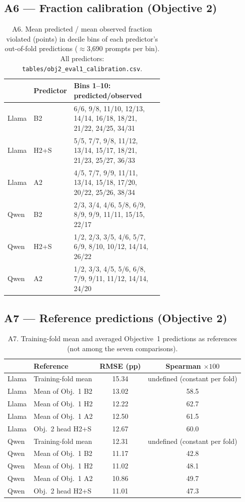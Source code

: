 \subsection*{A6 --- Fraction calibration (Objective 2)}
\begin{table}[h]
\centering\scriptsize
\caption{A6. Mean predicted / mean observed fraction violated (points) in decile bins of each predictor's out-of-fold predictions ($\approx$3,690 prompts per bin). All predictors: \texttt{tables/obj2\_eval1\_calibration.csv}.}
\label{tab:A6}
\begin{tabular}{llp{0.62\linewidth}}
\toprule
 & Predictor & Bins 1--10: predicted/observed \\
\midrule
Llama & B2 & 6/6, 9/8, 11/10, 12/13, 14/14, 16/18, 18/21, 21/22, 24/25, 34/31 \\
Llama & H2+S & 5/5, 7/7, 9/8, 11/12, 13/14, 15/17, 18/21, 21/23, 25/27, 36/33 \\
Llama & A2 & 4/5, 7/7, 9/9, 11/11, 13/14, 15/18, 17/20, 20/22, 25/26, 38/34 \\
Qwen & B2 & 2/3, 3/4, 4/6, 5/8, 6/9, 8/9, 9/9, 11/11, 15/15, 22/17 \\
Qwen & H2+S & 1/2, 2/3, 3/5, 4/6, 5/7, 6/9, 8/10, 10/12, 14/14, 26/22 \\
Qwen & A2 & 1/2, 3/3, 4/5, 5/6, 6/8, 7/9, 9/11, 11/12, 14/14, 24/20 \\
\bottomrule
\end{tabular}
\end{table}

\subsection*{A7 --- Reference predictions (Objective 2)}
\begin{table}[h]
\centering\scriptsize
\caption{A7. Training-fold mean and averaged Objective~1 predictions as references (not among the seven comparisons).}
\label{tab:A7}
\begin{tabular}{llcc}
\toprule
 & Reference & RMSE (pp) & Spearman $\times100$ \\
\midrule
Llama & Training-fold mean & 15.34 & undefined (constant per fold) \\
Llama & Mean of Obj.~1 B2 & 13.02 & 58.5 \\
Llama & Mean of Obj.~1 H2 & 12.22 & 62.7 \\
Llama & Mean of Obj.~1 A2 & 12.50 & 61.5 \\
Llama & Obj.~2 head H2+S & 12.67 & 60.0 \\
\midrule
Qwen & Training-fold mean & 12.31 & undefined (constant per fold) \\
Qwen & Mean of Obj.~1 B2 & 11.17 & 42.8 \\
Qwen & Mean of Obj.~1 H2 & 11.02 & 48.1 \\
Qwen & Mean of Obj.~1 A2 & 10.86 & 49.7 \\
Qwen & Obj.~2 head H2+S & 11.01 & 47.3 \\
\bottomrule
\end{tabular}
\end{table}


